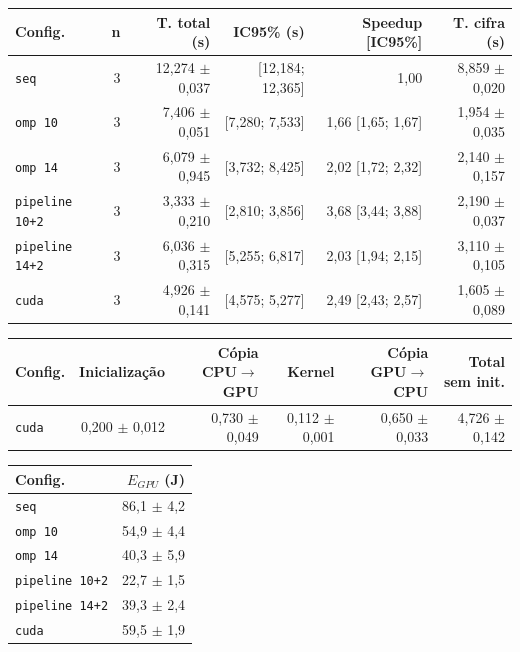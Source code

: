 
\begin{tabular}{lrrrrr}
\hline
\textbf{Config.} & \textbf{n} & \textbf{T. total (s)} & \textbf{IC95\% (s)} & \textbf{Speedup [IC95\%]} & \textbf{T. cifra (s)} \\
\hline
\texttt{seq} & 3 & 12,274 $\pm$ 0,037 & [12,184; 12,365] & 1,00 & 8,859 $\pm$ 0,020 \\
\texttt{omp 10} & 3 & 7,406 $\pm$ 0,051 & [7,280; 7,533] & 1,66 [1,65; 1,67] & 1,954 $\pm$ 0,035 \\
\texttt{omp 14} & 3 & 6,079 $\pm$ 0,945 & [3,732; 8,425] & 2,02 [1,72; 2,32] & 2,140 $\pm$ 0,157 \\
\texttt{pipeline 10+2} & 3 & 3,333 $\pm$ 0,210 & [2,810; 3,856] & 3,68 [3,44; 3,88] & 2,190 $\pm$ 0,037 \\
\texttt{pipeline 14+2} & 3 & 6,036 $\pm$ 0,315 & [5,255; 6,817] & 2,03 [1,94; 2,15] & 3,110 $\pm$ 0,105 \\
\texttt{cuda} & 3 & 4,926 $\pm$ 0,141 & [4,575; 5,277] & 2,49 [2,43; 2,57] & 1,605 $\pm$ 0,089 \\
\hline
\end{tabular}

\begin{tabular}{lrrrrr}
\hline
\textbf{Config.} & \textbf{Inicializa\c{c}\~ao} & \textbf{C\'opia CPU$\to$GPU} & \textbf{Kernel} & \textbf{C\'opia GPU$\to$CPU} & \textbf{Total sem init.} \\
\hline
\texttt{cuda} & 0,200 $\pm$ 0,012 & 0,730 $\pm$ 0,049 & 0,112 $\pm$ 0,001 & 0,650 $\pm$ 0,033 & 4,726 $\pm$ 0,142 \\
\hline
\end{tabular}

\begin{tabular}{lr}
\hline
\textbf{Config.} & \textbf{$E_{GPU}$ (J)} \\
\hline
\texttt{seq} & 86,1 $\pm$ 4,2 \\
\texttt{omp 10} & 54,9 $\pm$ 4,4 \\
\texttt{omp 14} & 40,3 $\pm$ 5,9 \\
\texttt{pipeline 10+2} & 22,7 $\pm$ 1,5 \\
\texttt{pipeline 14+2} & 39,3 $\pm$ 2,4 \\
\texttt{cuda} & 59,5 $\pm$ 1,9 \\
\hline
\end{tabular}

